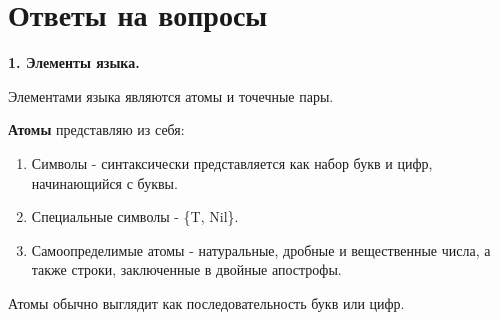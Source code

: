 \section*{Ответы на вопросы}
\setcounter{page}{2}









\textbf{1. Элементы языка.}

Элементами языка являются атомы и точечные пары.

\textbf{Атомы} представляю из себя:
\begin{enumerate}
	\item Символы - синтаксически представляется как набор букв и цифр, начинающийся с буквы.
	\item Специальные символы - \{T, Nil\}.
	\item Самоопределимые атомы - натуральные, дробные и вещественные числа, а также строки, заключенные в двойные апострофы. 
\end{enumerate}

Атомы обычно выглядит как последовательность букв или цифр.


